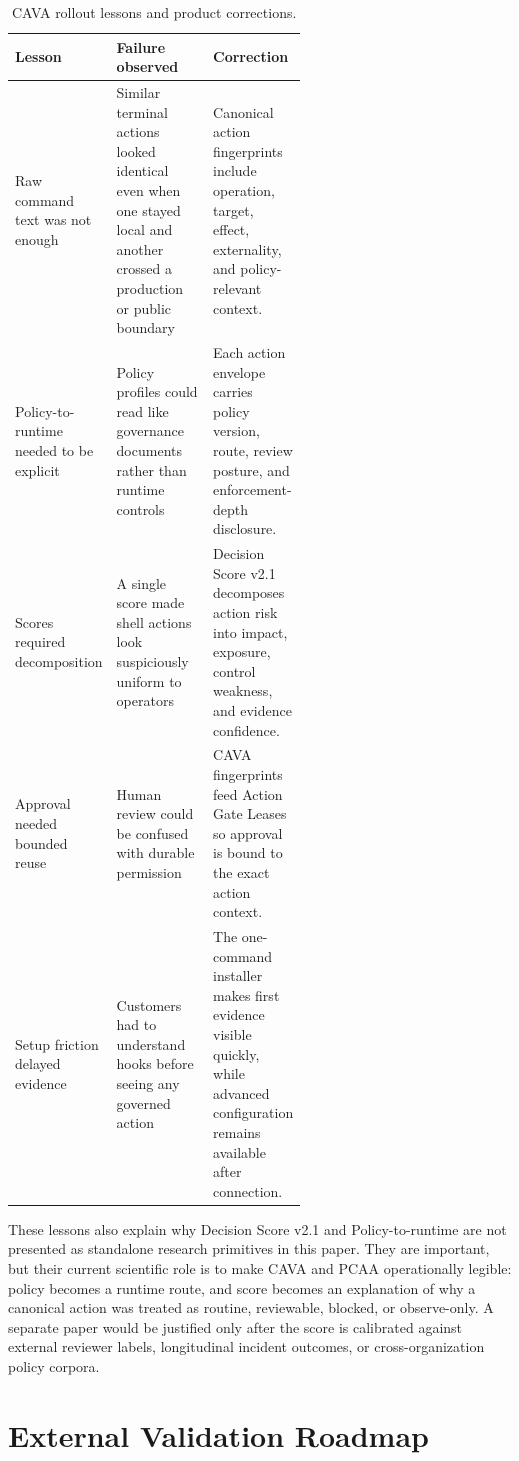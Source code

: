 \documentclass[11pt]{article}
\begin{document}
\begin{table}[t]
\centering
\small
\caption{CAVA rollout lessons and product corrections.}
\label{tab:cava-rollout-lessons}
\begin{tabularx}{\linewidth}{@{}L{0.25\linewidth}L{0.33\linewidth}X@{}}
\toprule
Lesson & Failure observed & Correction \\
\midrule
Raw command text was not enough & Similar terminal actions looked identical even when one stayed local and another crossed a production or public boundary & Canonical action fingerprints include operation, target, effect, externality, and policy-relevant context. \\
Policy-to-runtime needed to be explicit & Policy profiles could read like governance documents rather than runtime controls & Each action envelope carries policy version, route, review posture, and enforcement-depth disclosure. \\
Scores required decomposition & A single score made shell actions look suspiciously uniform to operators & Decision Score v2.1 decomposes action risk into impact, exposure, control weakness, and evidence confidence. \\
Approval needed bounded reuse & Human review could be confused with durable permission & CAVA fingerprints feed Action Gate Leases so approval is bound to the exact action context. \\
Setup friction delayed evidence & Customers had to understand hooks before seeing any governed action & The one-command installer makes first evidence visible quickly, while advanced configuration remains available after connection. \\
\bottomrule
\end{tabularx}
\end{table}

These lessons also explain why Decision Score v2.1 and Policy-to-runtime are not presented as standalone research primitives in this paper. They are important, but their current scientific role is to make CAVA and PCAA operationally legible: policy becomes a runtime route, and score becomes an explanation of why a canonical action was treated as routine, reviewable, blocked, or observe-only. A separate paper would be justified only after the score is calibrated against external reviewer labels, longitudinal incident outcomes, or cross-organization policy corpora.

\section{External Validation Roadmap}
\end{document}
